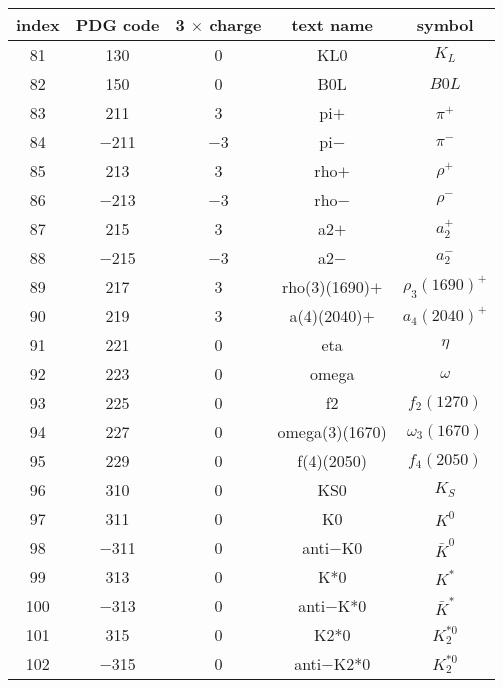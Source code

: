 \documentclass{article}
\begin{document}
\begin{table}[!htbp]
\centering
\begin{tabular}{|c|c|c|c|c|}
\hline
index & PDG code & 3 $\times$ charge & text name & symbol \\
\hline
81 & 130 & 0 & K\underline{\hspace{0.6em}}L0 & $K_{L}$ \\
\hline
82 & 150 & 0 & B0L & $B0L$ \\
\hline
83 & 211 & 3 & pi$+$ & $\pi^{+}$ \\
\hline
84 & $-$211 & $-$3 & pi$-$ & $\pi^{-}$ \\
\hline
85 & 213 & 3 & rho$+$ & $\rho^{+}$ \\
\hline
86 & $-$213 & $-$3 & rho$-$ & $\rho^{-}$ \\
\hline
87 & 215 & 3 & a\underline{\hspace{0.6em}}2$+$ & $a_{2}^{+}$ \\
\hline
88 & $-$215 & $-$3 & a\underline{\hspace{0.6em}}2$-$ & $a_{2}^{-}$ \\
\hline
89 & 217 & 3 & rho(3)(1690)$+$ & $\rho_{3}(1690)^{+}$ \\
\hline
90 & 219 & 3 & a(4)(2040)$+$ & $a_{4}(2040)^{+}$ \\
\hline
91 & 221 & 0 & eta & $\eta$ \\
\hline
92 & 223 & 0 & omega & $\omega$ \\
\hline
93 & 225 & 0 & f\underline{\hspace{0.6em}}2 & $f_{2}(1270)$ \\
\hline
94 & 227 & 0 & omega(3)(1670) & $\omega_{3}(1670)$ \\
\hline
95 & 229 & 0 & f(4)(2050) & $f_{4}(2050)$ \\
\hline
96 & 310 & 0 & K\underline{\hspace{0.6em}}S0 & $K_{S}$ \\
\hline
97 & 311 & 0 & K0 & $K^{0}$ \\
\hline
98 & $-$311 & 0 & anti$-$K0 & $\bar{K}^{0}$ \\
\hline
99 & 313 & 0 & K*0 & $K^{*}$ \\
\hline
100 & $-$313 & 0 & anti$-$K*0 & $\bar{K}^{*}$ \\
\hline
101 & 315 & 0 & K\underline{\hspace{0.6em}}2*0 & $K_2^{*0}$ \\
\hline
102 & $-$315 & 0 & anti$-$K\underline{\hspace{0.6em}}2*0 & $K_2^{*0}$ \\

\end{tabular}
\end{table}
\end{document}

